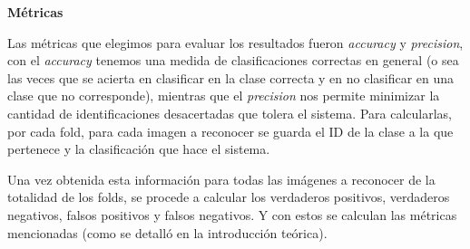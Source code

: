 \textbf{Métricas}
\par Las métricas que elegimos para evaluar los resultados fueron \textit{accuracy} y \textit{precision}, con el \textit{accuracy} tenemos una medida de clasificaciones correctas en general (o sea las veces que se acierta en clasificar en la clase correcta y en no clasificar en una clase que no corresponde), mientras que el \textit{precision} nos permite minimizar la cantidad de identificaciones desacertadas que tolera el sistema.
Para calcularlas, por cada fold, para cada imagen a reconocer se guarda el ID de la clase a la que pertenece y la clasificación que hace el sistema.
\par Una vez obtenida esta información para todas las imágenes a reconocer de la totalidad de los folds, se procede a calcular los verdaderos positivos, verdaderos negativos, falsos positivos y falsos negativos. Y con estos se calculan las métricas mencionadas (como se detalló en la introducción teórica).